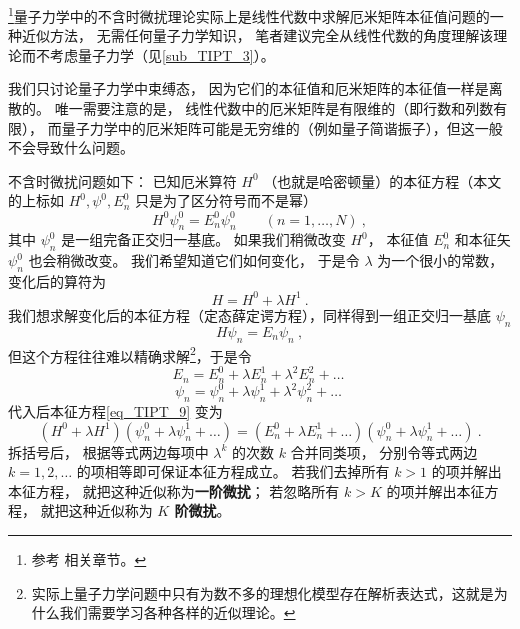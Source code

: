 

\footnote{参考 \cite{GriffQ} \cite{Shankar} \cite{Sakurai} \cite{Merzbacher} 相关章节。}量子力学中的不含时微扰理论实际上是线性代数中求解厄米矩阵本征值问题的一种近似方法， 无需任何量子力学知识， 笔者建议完全从线性代数的角度理解该理论而不考虑量子力学（见\autoref{sub_TIPT_3}）。

我们只讨论量子力学中束缚态， 因为它们的本征值和厄米矩阵的本征值一样是离散的。 唯一需要注意的是， 线性代数中的厄米矩阵是有限维的（即行数和列数有限）， 而量子力学中的厄米矩阵可能是无穷维的（例如量子简谐振子），但这一般不会导致什么问题。

不含时微扰问题如下： 已知厄米算符 $H^0$ （也就是哈密顿量）的本征方程（本文的上标如 $H^0, \psi^0, E_n^0$ 只是为了区分符号而不是幂）
\begin{equation}
H^0 \psi_n^0 = E_n^0 \psi_n^0 \qquad (n = 1,\dots, N)~,
\end{equation}
其中 $\psi_n^0$ 是一组完备正交归一基底。 如果我们稍微改变 $H^0$， 本征值 $E_n^0$ 和本征矢 $\psi_n^0$ 也会稍微改变。 我们希望知道它们如何变化， 于是令 $\lambda$ 为一个很小的常数， 变化后的算符为
\begin{equation}\label{eq_TIPT_3}
H = H^0 + \lambda H^1~.
\end{equation}
我们想求解变化后的本征方程（定态薛定谔方程），同样得到一组正交归一基底 $\psi_n$
\begin{equation}\label{eq_TIPT_9}
H \psi_n = E_n \psi_n~,
\end{equation}
但这个方程往往难以精确求解\footnote{实际上量子力学问题中只有为数不多的理想化模型存在解析表达式，这就是为什么我们需要学习各种各样的近似理论。}，于是令
\begin{equation}\label{eq_TIPT_11}
E_n = E_n^0 + \lambda E_n^1 + \lambda^2 E_n^2 + \dots~
\end{equation}
\begin{equation}\label{eq_TIPT_12}
\psi_n = \psi_n^0 + \lambda\psi_n^1 + \lambda^2 \psi_n^2 + \dots~
\end{equation}
代入后本征方程\autoref{eq_TIPT_9} 变为
\begin{equation}\label{eq_TIPT_10}
(H^0 + \lambda H^1)(\psi_n^0 + \lambda\psi_n^1 + \dots) = (E_n^0 + \lambda E_n^1 + \dots)(\psi_n^0 + \lambda\psi_n^1 + \dots)~.
\end{equation}
拆括号后， 根据等式两边每项中 $\lambda^k$ 的次数 $k$ 合并同类项， 分别令等式两边 $k=1,2,\dots$ 的项相等即可保证本征方程成立。 若我们去掉所有 $k > 1$ 的项并解出本征方程， 就把这种近似称为\textbf{一阶微扰}； 若忽略所有 $k > K$ 的项并解出本征方程， 就把这种近似称为 \textbf{$K$ 阶微扰}。


